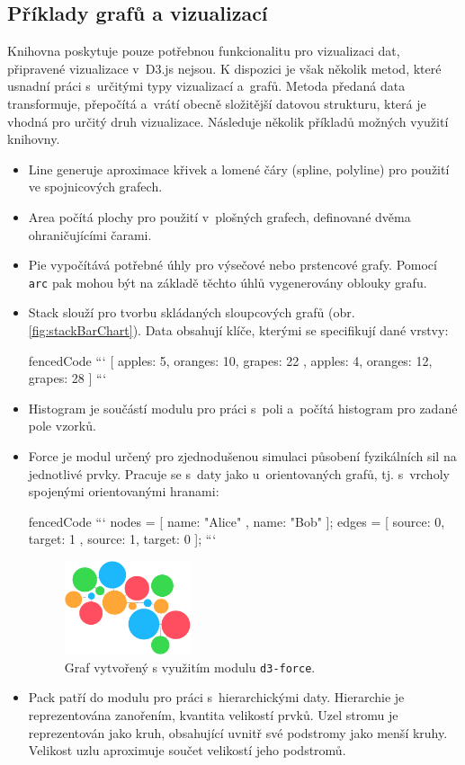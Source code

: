\documentclass[
  digital, %
  oneside, %
  table,   %
  nolof,     %
  nolot,     %
]{fithesis3}
\begin{document}
\subsection{Příklady grafů a vizualizací}\label{d3jsGraphs}
Knihovna poskytuje pouze potřebnou funkcionalitu pro vizualizaci dat, připravené vizualizace v~D3.js nejsou. K dispozici je však několik metod, které usnadní práci s~určitými typy vizualizací a~grafů. Metoda předaná data transformuje, přepočítá a~vrátí obecně složitější datovou strukturu, která je vhodná pro určitý druh vizualizace. Následuje několik příkladů možných využití knihovny. \cite{d3APIReference}
\begin{itemize}
  \item Line generuje aproximace křivek a lomené čáry (spline, poly\-line) pro použití ve spojnicových grafech.
  \item Area počítá plochy pro použití v~plošných grafech, definované dvěma ohraničujícími čarami.
  \item Pie vypočítává potřebné úhly pro výsečové nebo prstencové grafy. Pomocí \verb|arc| pak mohou být na základě těchto úhlů vygenerovány oblouky grafu.
  \item Stack slouží pro tvorbu skládaných sloupcových grafů (obr. \ref{fig:stackBarChart}). Data obsahují klíče, kterými se specifikují dané vrstvy:
\begin{markdown*}{
  fencedCode
}
```
	[{ apples: 5, oranges: 10, grapes: 22 },
	{ apples: 4, oranges: 12, grapes: 28 }]
```
\end{markdown*}
  \item Histogram je součástí modulu pro práci s~poli a~počítá histogram pro zadané pole vzorků.
  \item Force je modul určený pro zjednodušenou simulaci působení fyzikálních sil na jednotlivé prvky. Pracuje se s~daty jako u~orientovaných grafů, tj. s~vrcholy spojenými orientovanými hranami:
\begin{markdown*}{
  fencedCode
}
```
	nodes = [{ name: "Alice" }, { name: "Bob" }];
	edges = [{ source: 0, target: 1 },
			 { source: 1, target: 0 }];
```
\end{markdown*}
\begin{figure}[H]
  \begin{center}
    \includegraphics[width=3.7cm]{images/force.pdf}
  \end{center}
  \caption{Graf vytvořený s využitím modulu \texttt{d3-force}.}
  \label{fig:forceGraph}
\end{figure}
  \item Pack patří do modulu pro práci s~hierarchickými daty. Hierarchie je reprezentována zanořením, kvantita velikostí prvků. Uzel stromu je reprezentován jako kruh, obsahující uvnitř své podstromy jako menší kruhy. Velikost uzlu aproximuje součet velikostí jeho podstromů.
\end{itemize}
\end{document}

